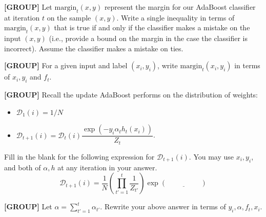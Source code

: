 \documentclass[11pt,addpoints,answers]{exam}
\newcommand{\group}{\textbf{[GROUP]} }
\newcommand{\D}{\mathcal{D}}
\newcommand{\margin}{\text{margin}}
\begin{document}
\begin{questions}
\begin{parts}
\begin{subparts}
\begin{your_solution}[height=3cm, width=6cm]
\end{your_solution}


\clearpage

\subpart[1] \group Let $\margin_t (x, y)$ represent the margin for our AdaBoost classifier at iteration $t$ on the sample $(x, y)$. Write a single inequality in terms of $\margin_t (x, y)$ that is true if and only if the classifier makes a mistake on the input $(x, y)$ (i.e., provide a bound on the margin in the case the classifier is incorrect). Assume the classifier makes a mistake on ties.


\begin{your_solution}[height=3cm, width=6cm]
\end{your_solution}



\subpart[1] \group For a given input and label $(x_i, y_i)$, write $\margin_t (x_i, y_i)$ in terms of $x_i, y_i$ and $f_t$.

\begin{your_solution}[height=3cm, width=6cm]
\end{your_solution}

\subpart[1] \group Recall the update AdaBoost performs on the distribution of weights:
\begin{itemize}
    \item $\D_1 (i) = 1 / N$
    \item $\D_{t+1} (i) = \D_t (i) \dfrac{\exp(-y_i \alpha_t h_t (x_i))}{Z_t}$.
\end{itemize}
Fill in the blank for the following expression for $\D_{t+1} (i)$. You may use $x_i, y_i$, and both of $\alpha, h$ at any iteration in your answer.
$$ \D_{t+1} (i) = \dfrac{1}{N} \left( \prod_{t'=1}^t \dfrac{1}{Z_{t'}} \right) \exp ( \underline{\hspace{2cm}} )$$

\begin{your_solution}[height=3cm, width=6cm]
\end{your_solution}

\clearpage

\subpart[1] \group Let $\alpha = \sum_{t'=1}^t \alpha_{t'}$. Rewrite your above answer in terms of $y_i, \alpha, f_t, x_i$.

\begin{your_solution}[height=3cm, width=6cm]
\end{your_solution}




\end{subparts}
\end{parts}
\end{questions}
\end{document}
